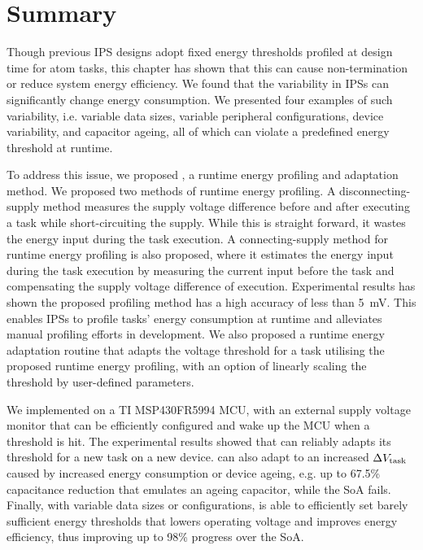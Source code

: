 \section{Summary}

Though previous IPS designs adopt fixed energy thresholds profiled at design time for atom tasks, this chapter has shown that this can cause non-termination or reduce system energy efficiency. 
We found that the variability in IPSs can significantly change energy consumption.
We presented four examples of such variability, i.e. variable data sizes, variable peripheral configurations, device variability, and capacitor ageing, all of which can violate a predefined energy threshold at runtime. 

To address this issue, we proposed \nn{}, a runtime energy profiling and adaptation method. 
We proposed two methods of runtime energy profiling. 
A disconnecting-supply method measures the supply voltage difference before and after executing a task while short-circuiting the supply. 
While this is straight forward, it wastes the energy input during the task execution.
A connecting-supply method for runtime energy profiling is also proposed, where it estimates the energy input during the task execution by measuring the current input before the task and compensating the supply voltage difference of execution. 
Experimental results has shown the proposed profiling method has a high accuracy of less than \SI{5}{\milli\volt}.
This enables IPSs to profile tasks' energy consumption at runtime and alleviates manual profiling efforts in development.
We also proposed a runtime energy adaptation routine that adapts the voltage threshold for a task utilising the proposed runtime energy profiling, with an option of linearly scaling the threshold by user-defined parameters. 

We implemented \nn{} on a TI MSP430FR5994 MCU, with an external supply voltage monitor that can be efficiently configured and wake up the MCU when a threshold is hit. 
The experimental results showed that \nn{} can reliably adapts its threshold for a new task on a new device. 
\nn{} can also adapt to an increased $\Delta V_{\text{task}}$ caused by increased energy consumption or device ageing, e.g. up to 67.5\% capacitance reduction that emulates an ageing capacitor, while the SoA fails. 
Finally, with variable data sizes or configurations, \nn{} is able to efficiently set barely sufficient energy thresholds that lowers operating voltage and improves energy efficiency, thus improving up to 98\% progress over the SoA. 

